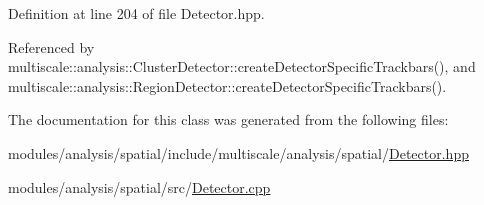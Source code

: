 Definition at line 204 of file Detector.\-hpp.



Referenced by multiscale\-::analysis\-::\-Cluster\-Detector\-::create\-Detector\-Specific\-Trackbars(), and multiscale\-::analysis\-::\-Region\-Detector\-::create\-Detector\-Specific\-Trackbars().



The documentation for this class was generated from the following files\-:\begin{DoxyCompactItemize}
\item 
modules/analysis/spatial/include/multiscale/analysis/spatial/\hyperlink{Detector_8hpp}{Detector.\-hpp}\item 
modules/analysis/spatial/src/\hyperlink{Detector_8cpp}{Detector.\-cpp}\end{DoxyCompactItemize}
